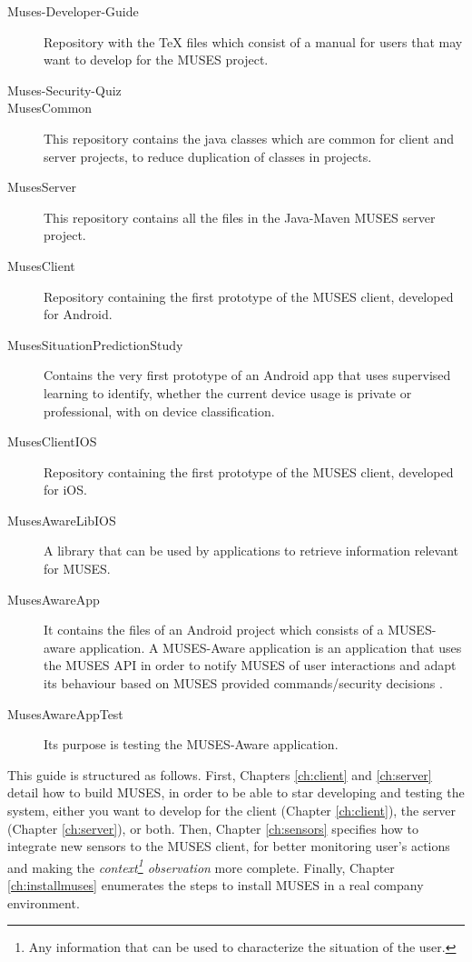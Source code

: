 \documentclass[a4paper,11pt]{book}
\begin{document}
\begin{description}
  \item[Muses-Developer-Guide] Repository with the TeX files which consist of a manual for users that may want to develop for the MUSES project.
  \item[Muses-Security-Quiz]
  \item[MusesCommon] This repository contains the java classes which are common for client and server projects, to reduce duplication of classes in projects.
  \item[MusesServer] This repository contains all the files in the Java-Maven MUSES server project.
  \item[MusesClient] Repository containing the first prototype of the MUSES client, developed for Android.
  \item[MusesSituationPredictionStudy] Contains the very first prototype of an Android app that uses supervised learning to identify, whether the current device usage is private or professional, with on device classification.
  \item[MusesClientIOS] Repository containing the first prototype of the MUSES client, developed for iOS.
  \item[MusesAwareLibIOS] A library that can be used by applications to retrieve information relevant for MUSES.
  \item[MusesAwareApp] It contains the files of an Android project which consists of a MUSES-aware application. A MUSES-Aware application is an application that uses the MUSES API in order to notify MUSES of user interactions and adapt its behaviour based on MUSES provided commands/security decisions \cite{deliverable24}.
  \item[MusesAwareAppTest] Its purpose is testing the MUSES-Aware application.
\end{description}

This guide is structured as follows. First, Chapters \ref{ch:client} and \ref{ch:server} detail how to build MUSES, in order to be able to star developing and testing the system, either you want to develop for the client (Chapter \ref{ch:client}), the server (Chapter \ref{ch:server}), or both. Then, Chapter \ref{ch:sensors} specifies how to integrate new sensors to the MUSES client, for better monitoring user's actions and making the \textit{context\footnote{Any information that can be used to characterize the situation of the user.\cite{deliverable61}} observation} more complete. Finally, Chapter \ref{ch:installmuses} enumerates the steps to install MUSES in a real company environment.
\end{document}
